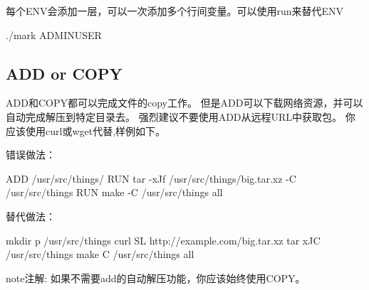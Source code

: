 \documentclass[letterpaper,10pt,english]{sphinxmanual}
\begin{document}
每个ENV会添加一层，可以一次添加多个行间变量。可以使用run来替代ENV

%
\begin{sphinxVerbatim}[commandchars=\\\{\}]
   
       \PYGZgt{} ./mark 
      ADMIN\PYGZus{}USER
\end{sphinxVerbatim}


\subsection{ADD or COPY}
\label{\detokenize{_u8fd0_u884c_u5e94_u7528/02-dockerfile_u7f16_u5199_u6700_u4f73_u5b9e_u8df5:add-or-copy}}
ADD和COPY都可以完成文件的copy工作。 但是ADD可以下载网络资源，并可以自动完成解压到特定目录去。
强烈建议不要使用ADD从远程URL中获取包。 你应该使用curl或wget代替,样例如下。

错误做法：

%
\begin{sphinxVerbatim}[commandchars=\\\{\}]

\end{sphinxVerbatim}

ADD  /usr/src/things/
RUN tar -xJf /usr/src/things/big.tar.xz -C /usr/src/things
RUN make -C /usr/src/things all

替代做法：

%
\begin{sphinxVerbatim}[commandchars=\\\{\}]
 mkdir \PYGZhy{}p /usr/src/things 
     curl \PYGZhy{}SL http://example.com/big.tar.xz 
     tar \PYGZhy{}xJC /usr/src/things 
     make \PYGZhy{}C /usr/src/things all
\end{sphinxVerbatim}

\begin{sphinxadmonition}{note}{注解:}
如果不需要add的自动解压功能，你应该始终使用COPY。
\end{sphinxadmonition}
\end{document}
